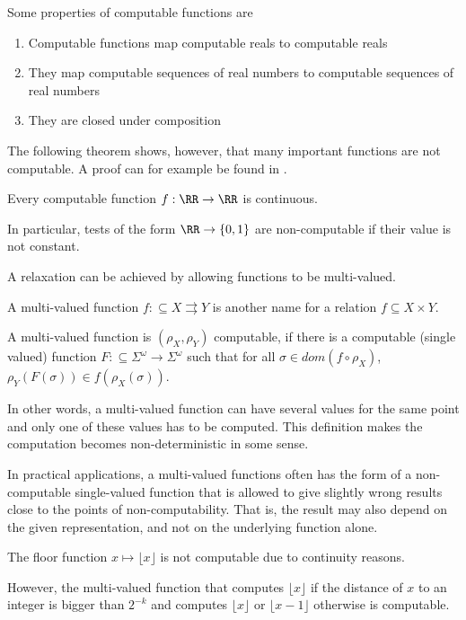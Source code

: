 Some  properties of computable functions are
\begin{enumerate}
  \item Computable functions map computable reals to computable reals
  \item They map computable sequences of real numbers to computable
    sequences of real numbers
  \item They are closed under composition
\end{enumerate}

The following theorem shows, however, that many important functions are not computable. 
A proof can for example be found in \cite{Wei}.
\begin{theorem}
  Every computable function $f: \RR \to \RR$ is continuous.
\end{theorem}

In particular, tests of the form $\RR \to \{0,1\}$ are non-computable if their
value is not constant. 

A relaxation can be achieved by allowing functions to be multi-valued.
\begin{definition}
A multi-valued function $f: \subseteq X \rightrightarrows Y$ is another name for a relation $f \subseteq X \times Y$.

A multi-valued function is $(\rho_X, \rho_Y)$ computable, if there is a
computable (single valued) function 
$F: \subseteq \Sigma^\omega \to \Sigma^\omega$ such that for all $\sigma \in dom(f \circ \rho_X)$, $\rho_Y(F(\sigma)) \in f(\rho_X(\sigma))$. 
\end{definition}
In other words, a multi-valued function can have several values for the same point and only one
of these values has to be computed. 
This definition makes the computation becomes non-deterministic in some sense.

In practical applications, a multi-valued functions often
has the form of a non-computable single-valued function that is allowed to
give slightly wrong results close to the points of non-computability.
That is, the result may also depend on the given representation, and not on the
underlying function alone.
\begin{example}
  The floor function $x \mapsto \lfloor x \rfloor$ is not computable due to
  continuity reasons.
  
  However, the multi-valued function that computes $\lfloor x \rfloor$ if the
  distance of $x$ to an integer is bigger than $2^{-k}$ and computes $\lfloor x
  \rfloor$ or $\lfloor x-1 \rfloor$ otherwise is computable.
\end{example}

